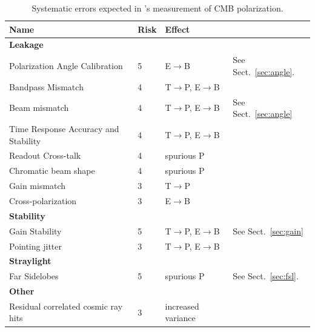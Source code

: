 \documentclass[PICOReport.tex]{subfiles}
\begin{document}
\begin{table}[h!]
\centering
\scriptsize
 \begin{tabular}{p{3.3cm} p{0.5cm} p{1.5cm} p{2.5cm}}
 \hline
\textbf{Name} & \textbf{Risk}&\textbf{Effect} \\
 \hline
\textbf{Leakage}& &\\
Polarization Angle Calibration\dotfill& 
5&
E$\to$B &
See Sect.~\ref{sec:angle}.
\\
 Bandpass Mismatch\dotfill&
 4& 
T$\to$P, E$\to$B  
   \\
Beam mismatch\dotfill& 
4&
T$\to$P, E$\to$B
& See Sect.~\ref{sec:angle}
\\
Time Response Accuracy and Stability\dotfill&
4&
T$\to$P, E$\to$B
\\
Readout Cross-talk\dotfill& 
4&
spurious P
\\
Chromatic beam shape\dotfill&
4&
spurious P
\\

Gain mismatch\dotfill&
3&
T$\to$P   
\\


Cross-polarization\dotfill&
3&
E$\to$B
\\
\hline 
\textbf{Stability} & & \\
Gain Stability\dotfill& 
5&
T$\to$P, E$\to$B
& 
See Sect.~\ref{sec:gain}
\\
Pointing jitter\dotfill&
3&
T$\to$P, E$\to$B
\\

\hline
\textbf{Straylight}& & \\
Far Sidelobes\dotfill& 
5&
spurious P
&
See Sect.~\ref{sec:fsl}.\\
 \hline
\textbf{Other} \\
Residual correlated cosmic ray hits\dotfill&
3 &
increased variance
\\
\hline
 \end{tabular}
\caption{\label{tbl:SystematicsList2col} Systematic errors expected in \pico's measurement of CMB polarization.}
 \end{table}
\end{document}
